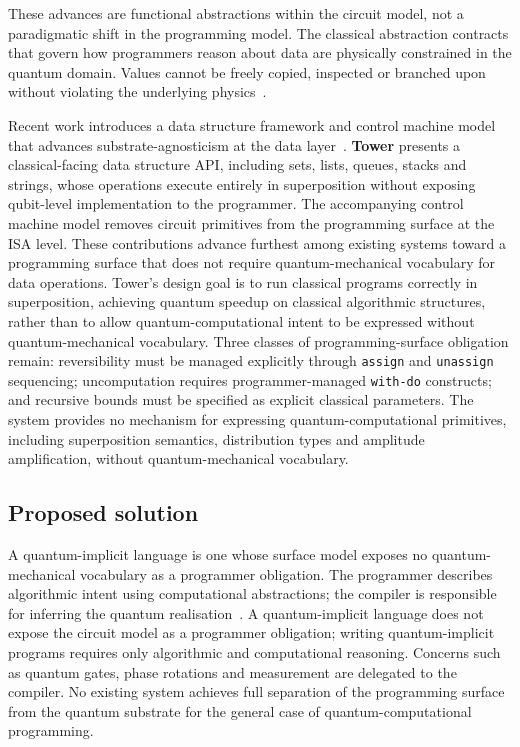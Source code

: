 These advances are functional abstractions within the circuit model, not a paradigmatic shift in the programming model.
The classical abstraction contracts that govern how programmers reason about data are physically constrained in the quantum domain.
Values cannot be freely copied, inspected or branched upon without violating the underlying physics~\cite{yuan2025foundationalabstractions}.

Recent work introduces a data structure framework and control machine model that advances substrate-agnosticism at the data layer~\cite{yuan2025foundationalabstractions}.
\textbf{Tower} presents a classical-facing data structure API, including sets, lists, queues, stacks and strings, whose operations execute entirely in superposition without exposing qubit-level implementation to the programmer.
The accompanying control machine model removes circuit primitives from the programming surface at the ISA level.
These contributions advance furthest among existing systems toward a programming surface that does not require quantum-mechanical vocabulary for data operations.
Tower's design goal is to run classical programs correctly in superposition, achieving quantum speedup on classical algorithmic structures, rather than to allow quantum-computational intent to be expressed without quantum-mechanical vocabulary.
Three classes of programming-surface obligation remain: reversibility must be managed explicitly through \texttt{assign} and \texttt{unassign} sequencing; uncomputation requires programmer-managed \texttt{with-do} constructs; and recursive bounds must be specified as explicit classical parameters.
The system provides no mechanism for expressing quantum-computational primitives, including superposition semantics, distribution types and amplitude amplification, without quantum-mechanical vocabulary.

\subsection{Proposed solution}\label{subsec:pre_confirmation:introduction:proposed_solution}
A quantum-implicit language is one whose surface model exposes no quantum-mechanical vocabulary as a programmer obligation.
The programmer describes algorithmic intent using computational abstractions; the compiler is responsible for inferring the quantum realisation~\cite{nunez_corrales2025betterabstractmachines}.
A quantum-implicit language does not expose the circuit model as a programmer obligation; writing quantum-implicit programs requires only algorithmic and computational reasoning.
Concerns such as quantum gates, phase rotations and measurement are delegated to the compiler.
No existing system achieves full separation of the programming surface from the quantum substrate for the general case of quantum-computational programming.

